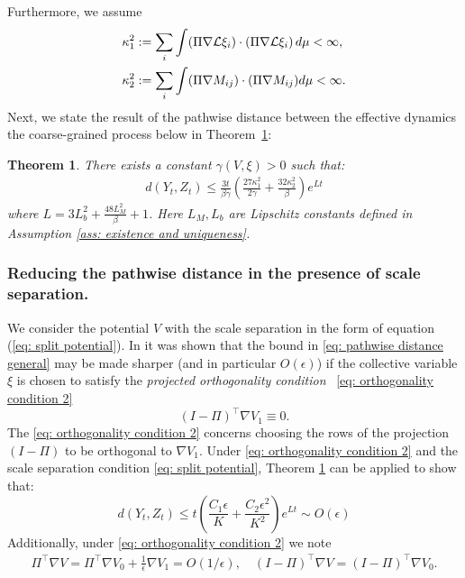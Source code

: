 \documentclass[reqno, 12pt]{article}
\newtheorem{theorem}{Theorem}
\begin{document}
Furthermore, we assume
\begin{align}
    \kappa^2_1 &:= \sum_i \int (\Pi \nabla \mathcal{L} \xi_i) \cdot (\Pi \nabla \mathcal{L}\xi_i) \,d\mu < \infty, \notag\\
    \kappa^2_2 &:= \sum_i \int (\Pi \nabla M_{ij}) \cdot (\Pi \nabla M_{ij})d\mu < \infty.
\end{align} 
Next, we state the result of the pathwise distance between the effective dynamics the coarse-grained process below in Theorem~\ref{thm: pathwise distance theorem}: 
\begin{theorem}{\cite[Theorem 1]{lelievre2019pathwise}}
\label{thm: pathwise distance theorem}
    There exists a constant $\gamma(V, \xi) > 0$ such that:
    \begin{align}
        d(Y_t, Z_t) \leq \frac{3t}{\beta \gamma} \left(\frac{27 \kappa^2_1}{2 \gamma} + \frac{32 \kappa^2_2}{\beta} \right)e^{Lt} \label{eq: pathwise distance general}
    \end{align}
    where $L = 3L^2_b + \frac{48 L^2_M}{\beta} + 1$. Here $L_M, L_b$ are Lipschitz constants defined in Assumption \eqref{ass: existence and uniqueness}. 
\end{theorem} 

\subsubsection{Reducing the pathwise distance in the presence of scale separation.}

We consider the potential $V$ with the scale separation in the form of equation (\ref{eq: split potential}). In \parencite{lelievre2019pathwise} it was shown that the bound in \eqref{eq: pathwise distance general} may be made sharper (and in particular $O(\epsilon)$) if the collective variable $\xi$ is chosen to satisfy the \emph{projected orthogonality condition} ~\eqref{eq: orthogonality condition 2}
\begin{equation}
    (I - \Pi)^\top \nabla V_1 \equiv 0. \label{eq: orthogonality condition 2} \tag{POC}
\end{equation}
The \eqref{eq: orthogonality condition 2} concerns choosing the rows of the projection $(I-\Pi)$ to be orthogonal to $\nabla V_1$. Under \eqref{eq: orthogonality condition 2} and the scale separation condition \eqref{eq: split potential}, Theorem \ref{thm: pathwise distance theorem} can be applied to show that:  
\begin{equation}
    d(Y_t, Z_t) \leq t\left(\frac{C_1 \epsilon}{K} + \frac{C_2 \epsilon^2}{K^2} \right) e^{Lt} \sim O(\epsilon)
\end{equation}
Additionally, under \eqref{eq: orthogonality condition 2} we note 
\begin{align}
    \Pi^\top \nabla V = \Pi^\top \nabla V_0 + \frac{1}{\epsilon} \nabla V_1 = O(1/\epsilon), \quad (I - \Pi)^\top \nabla V = (I - \Pi)^\top \nabla V_0.
\end{align}
\end{document}
